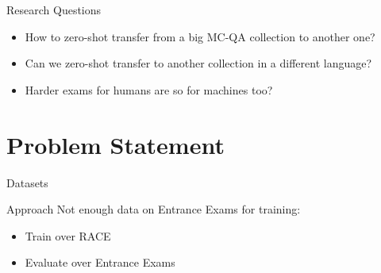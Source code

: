 \documentclass[]{beamer}
\def\mAlertSpace{\vspace{0.5em}}
\begin{document}

  \begin{frame}{\secname}
    \begin{alertblock}{Research Questions}
      \begin{itemize}
        \item How to zero-shot transfer from a big MC-QA collection to another one?
        \item Can we zero-shot transfer to another collection in a different language?
        \item Harder exams for humans are so for machines too?
      \end{itemize}
    \end{alertblock}
  \end{frame}

\section{Problem Statement}
  \begin{frame}{\secname}
    \begin{alertblock}{Datasets}
      \mAlertSpace
      
    \end{alertblock}
  \end{frame}


  \begin{frame}{\secname}
    \begin{alertblock}{Approach}
      \mAlertSpace
      Not enough data on Entrance Exams for training:
      \begin{itemize}
        \item Train over RACE
        \item Evaluate over Entrance Exams
      \end{itemize}
    \end{alertblock}
  \end{frame}
\end{document}

